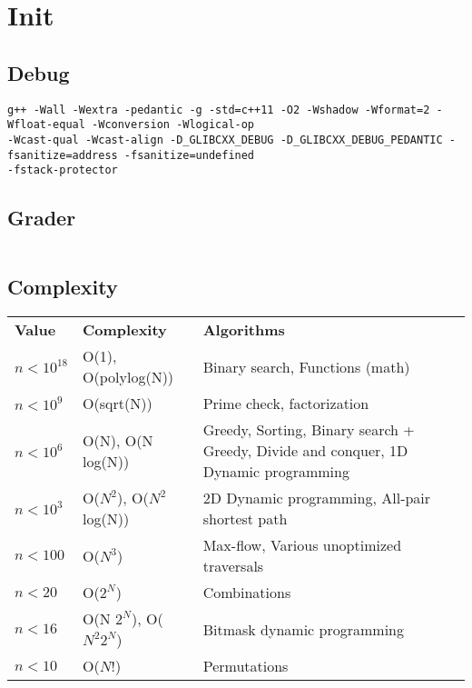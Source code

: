 \section{Init}
%
%

\subsection{Debug}
\begin{verbatim}
g++ -Wall -Wextra -pedantic -g -std=c++11 -O2 -Wshadow -Wformat=2 -Wfloat-equal -Wconversion -Wlogical-op 
-Wcast-qual -Wcast-align -D_GLIBCXX_DEBUG -D_GLIBCXX_DEBUG_PEDANTIC -fsanitize=address -fsanitize=undefined 
-fstack-protector
\end{verbatim}

\subsection{Grader}
\inputminted[frame=single,framesep=3pt,breaklines=true,tabsize=2,linenos]{python}{other/grader.py}

\subsection{Complexity}
\begin{tabular}[pos]{p{3cm}p{5cm}p{8cm}}
\textbf{Value} & \textbf{Complexity} & \textbf{Algorithms}\\
$n<10^{18}$ & O(1), O(polylog(N)) & Binary search, Functions (math)\\
$n<10^9$ & O(sqrt(N)) & Prime check, factorization\\
$n<10^6$ & O(N), O(N log(N)) & Greedy, Sorting, Binary search + Greedy, Divide and conquer, 1D Dynamic programming\\
$n<10^3$ & O($N^2$), O($N^2$ log(N)) & 2D Dynamic programming, All-pair shortest path\\
$n<100$ & O($N^3$) & Max-flow, Various unoptimized traversals\\
$n<20$ & O($2^N$) & Combinations\\
$n<16$ & O(N $2^N$), O($N^2 2^N$) & Bitmask dynamic programming\\
$n<10$ & O($N!$) & Permutations\\
\end{tabular}

